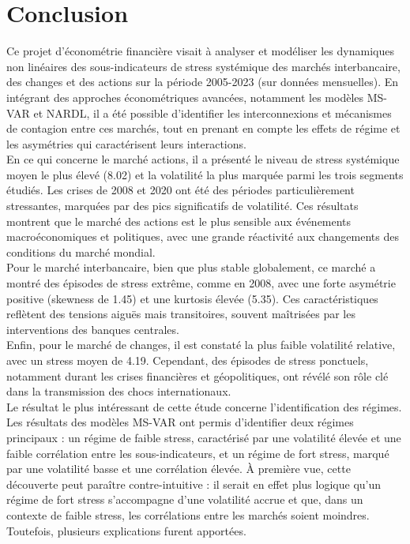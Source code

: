 \section*{Conclusion}

Ce projet d’économétrie financière visait à analyser et modéliser les dynamiques non linéaires des sous-indicateurs de stress systémique des marchés interbancaire, des changes et des actions sur la période 2005-2023 (sur données mensuelles). En intégrant des approches économétriques avancées, notamment les modèles MS-VAR et NARDL, il a été possible d'identifier les interconnexions et mécanismes de contagion entre ces marchés, tout en prenant en compte les effets de régime et les asymétries qui caractérisent leurs interactions.\\

En ce qui concerne le marché actions, il a présenté le niveau de stress systémique moyen le plus élevé (8.02) et la volatilité la plus marquée parmi les trois segments étudiés. Les crises de 2008 et 2020 ont été des périodes particulièrement stressantes, marquées par des pics significatifs de volatilité. Ces résultats montrent que le marché des actions est le plus sensible aux événements macroéconomiques et politiques, avec une grande réactivité aux changements des conditions du marché mondial.\\

Pour le marché interbancaire, bien que plus stable globalement, ce marché a montré des épisodes de stress extrême, comme en 2008, avec une forte asymétrie positive (skewness de 1.45) et une kurtosis élevée (5.35). Ces caractéristiques reflètent des tensions aiguës mais transitoires, souvent maîtrisées par les interventions des banques centrales.\\

Enfin, pour le marché de changes, il est constaté la plus faible volatilité relative, avec un stress moyen de 4.19. Cependant, des épisodes de stress ponctuels, notamment durant les crises financières et géopolitiques, ont révélé son rôle clé dans la transmission des chocs internationaux.\\

Le résultat le plus intéressant de cette étude concerne l'identification des régimes. Les résultats des modèles MS-VAR ont permis d’identifier deux régimes principaux : un régime de faible stress, caractérisé par une volatilité élevée et une faible corrélation entre les sous-indicateurs, et un régime de fort stress, marqué par une volatilité basse et une corrélation élevée. À première vue, cette découverte peut paraître contre-intuitive : il serait en effet plus logique qu’un régime de fort stress s’accompagne d’une volatilité accrue et que, dans un contexte de faible stress, les corrélations entre les marchés soient moindres. Toutefois, plusieurs explications furent apportées.\\

